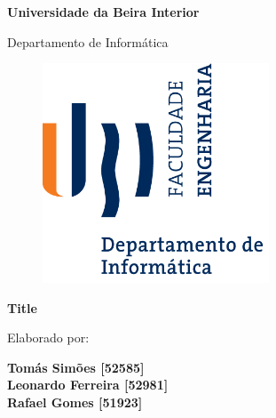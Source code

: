 \thispagestyle{empty}
\setcounter{page}{-1}

\begin{center}
  \begin{Huge}
    \textbf{Universidade da Beira Interior}
  \end{Huge}
\end{center}

\begin{center}
  \begin{Huge}
    Departamento de Informática
  \end{Huge}
\end{center}

\vspace{0,07cm}
\begin{figure}[!htb]
  \centering
  \includegraphics[width=191pt]{images/ubi-fe-di.png}
\end{figure}

\vspace{0.5cm}
\begin{center}
  \begin{Large}
    \textbf{Title}
  \end{Large}
\end{center}


\vspace{0.5cm}
\begin{center}
  \begin{normalsize}
    \begin{large}
      Elaborado por:
    \end{large}
  \end{normalsize}
\end{center}

\vspace{0.2cm}
\begin{center}
  \begin{large}
    \textbf{Tomás Simões [52585]} \\
    \textbf{Leonardo Ferreira [52981]} \\
    \textbf{Rafael Gomes [51923]} \\
  \end{large}
\end{center}

